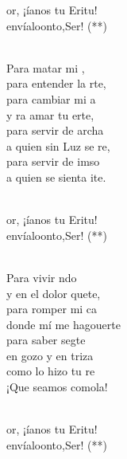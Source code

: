 \begin{cancion}%
	\begin{chorus}%
	or, ¡íanos tu Eritu!   \\
	envíaloonto,Ser! (**)\\
	\end{chorus}%
	\jump\\
	Para matar mi ,\\
	para entender la rte,\\
	para cambiar mi a\\
	y ra amar tu erte,\\
	para servir de archa\\
	a quien sin Luz se re,\\
	para servir de imso\\
	a quien se sienta ite. \\\jump\\
	\begin{chorus}%
	or, ¡íanos tu Eritu!   \\
	envíaloonto,Ser! (**)\\
	\end{chorus}%
	\jump\\
	Para vivir ndo\\
	y en el dolor quete,\\
	para romper mi ca\\
	donde  mí me hagouerte\\
	para saber segte\\
	en gozo y en triza\\
	como lo hizo tu re\\
	¡Que seamos comola!\\\jump\\
	\begin{chorus}%
	or, ¡íanos tu Eritu!   \\
	envíaloonto,Ser! (**)\\

\end{chorus}
\end{cancion}

